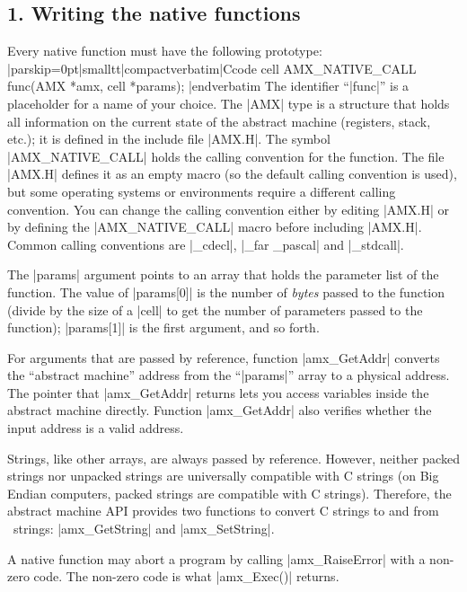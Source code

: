 \subsection{1. Writing the native functions}
Every native function must have the following prototype:
\listingx\verbatim|parskip=0pt|smalltt|compactverbatim|Ccode
cell AMX_NATIVE_CALL func(AMX *amx, cell *params);
|endverbatim\endlistingx
The identifier ``|func|'' is a placeholder for a name of your choice. The
|AMX| type is a structure that holds all information on the current state of
the abstract machine (registers, stack, etc.); it is defined in the include
file |AMX.H|. The symbol |AMX_NATIVE_CALL| holds the calling convention for
the function. The file |AMX.H| defines it as an empty macro (so the default
calling convention is used), but some operating systems or environments require
a different calling convention. You can change the calling convention either
by editing |AMX.H| or by defining the |AMX_NATIVE_CALL| macro before including
|AMX.H|. Common calling conventions are |_cdecl|, |_far _pascal| and
|_stdcall|.

The |params| argument points to an array that holds the parameter list of the
function. The value of |params[0]| is the number of {\it bytes\/} passed to
the function (divide by the size of a |cell| to get the number of parameters
passed to the function); |params[1]| is the first argument, and so forth.

For arguments that are passed by reference, function |amx_GetAddr| converts
the ``abstract machine'' address from the ``|params|'' array to a physical
address. The pointer that |amx_GetAddr| returns lets you access variables
inside the abstract machine directly. Function |amx_GetAddr| also verifies
whether the input address is a valid address.

\noindent{}%
Strings, like other arrays, are always passed by reference. However, neither
packed strings nor unpacked strings are universally compatible with C strings
(on Big Endian computers, packed strings are compatible with C strings).
Therefore, the abstract machine API provides two functions to convert C strings
to and from \Small\ strings: |amx_GetString| and |amx_SetString|.

A native function may abort a program by calling |amx_RaiseError| with
a non-zero code. The non-zero code is what |amx_Exec()| returns.

